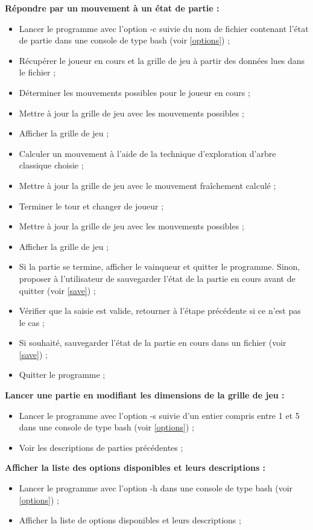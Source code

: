 \documentclass[10pt,a4paper]{article}
\begin{document}
\textbf{Répondre par un mouvement à un état de partie :}
\begin{itemize}
\item Lancer le programme avec l'option -c suivie du nom de fichier contenant l'état de partie dans une console de type bash (voir \ref{options}) ;\\
\item Récupérer le joueur en cours et la grille de jeu à partir des données lues dans le fichier ;
\item Déterminer les mouvements possibles pour le joueur en cours ;
\item Mettre à jour la grille de jeu avec les mouvements possibles ;
\item Afficher la grille de jeu ;\\
\item Calculer un mouvement à l'aide de la technique d'exploration d'arbre classique choisie ;
\item Mettre à jour la grille de jeu avec le mouvement fraîchement calculé ;
\item Terminer le tour et changer de joueur ;
\item Mettre à jour la grille de jeu avec les mouvements possibles ;
\item Afficher la grille de jeu ;
\item Si la partie se termine, afficher le vainqueur et quitter le programme.
Sinon, proposer à l'utilisateur de sauvegarder l'état de la partie en cours avant de quitter (voir \ref{save}) ;
\item Vérifier que la saisie est valide, retourner à l'étape précédente si ce n'est pas le cas ;
\item Si souhaité, sauvegarder l'état de la partie en cours dans un fichier (voir \ref{save}) ;
\item Quitter le programme ;\\
\end{itemize}
\newpage

\textbf{Lancer une partie en modifiant les dimensions de la grille de jeu :}
\begin{itemize}
\item Lancer le programme avec l'option -s suivie d'un entier compris entre 1 et 5 dans une console de type bash (voir \ref{options}) ;
\item Voir les descriptions de parties précédentes ;\\
\end{itemize}

\textbf{Afficher la liste des options disponibles et leurs descriptions :}
\begin{itemize}
\item Lancer le programme avec l'option -h dans une console de type bash (voir \ref{options}) ;
\item Afficher la liste de options disponibles et leurs descriptions ;\\
\end{itemize}
\end{document}
